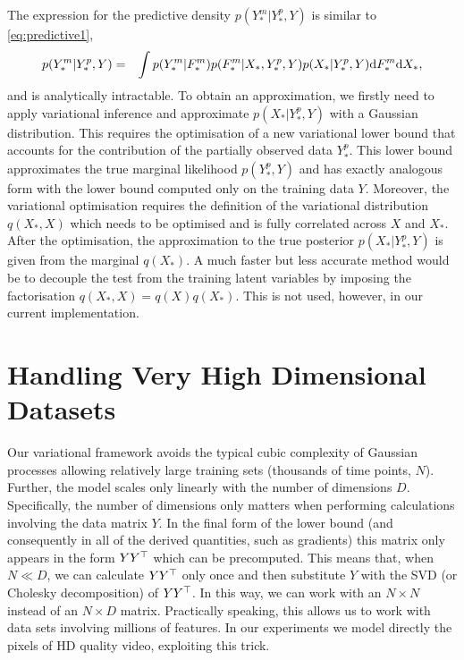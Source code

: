 \documentclass{article} %
\begin{document}
The expression for the predictive density $p(Y_*^m | Y_*^p, Y)$ is similar to  \eqref{eq:predictive1},
\begin{eqnarray}
p(Y_*^m | Y_*^p, Y) & = & \int p(Y_*^m | F_*^m)  p(F_*^m|X_*, Y_*^p, Y) p(X_*|  Y_*^p, Y) \text{d}  F_*^m \text{d}  X_* ,
\label{eq:predictive3}
\end{eqnarray}
and is analytically intractable. 
To obtain an approximation, we firstly need to apply variational inference and approximate $p(X_* | Y_*^p, Y)$ with a Gaussian distribution.
This requires the optimisation of a new variational lower bound that accounts for the contribution of the partially observed data $Y_*^p$. 
This lower bound approximates the true marginal likelihood $p(Y_*^p, Y)$ and has exactly analogous form with the lower bound computed only on the training data $Y$. 
Moreover, the variational optimisation requires the definition of the variational distribution $q(X_*,X)$ which needs to be optimised and is fully correlated across $X$ and $X_*$. 
After the optimisation, the approximation to the true posterior  $p(X_* | Y_*^p, Y)$ is given from the marginal $q(X_*)$. 
 A much faster but less
accurate method would be to decouple the test from the training latent
variables by imposing the factorisation $q(X_*, X) = q(X)
q(X_*)$. This is not used, however, in our current implementation.



\section{Handling Very High Dimensional Datasets}

Our variational framework avoids the typical cubic complexity of
Gaussian processes allowing relatively large training sets (thousands
of time points, $N$). Further, the model scales only linearly with the
number of dimensions $D$. Specifically, the number of dimensions only
matters when performing calculations involving the data matrix $Y$. In
the final form of the lower bound (and consequently in all of the
derived quantities, such as gradients) this matrix only appears in the
form $Y Y^{\top}$ which can be precomputed. This means that, when $N \ll
D$, we can calculate $Y Y^{\top}$ only once and then substitute $Y$ with
the SVD (or Cholesky decomposition) of $Y Y^{\top}$. In this way, we can
work with an $N \times N$ instead of an $N \times D$
matrix. Practically speaking, this allows us to work with data sets
involving millions of features. In our experiments we model directly
the pixels of HD quality video, exploiting this trick.
\end{document}
